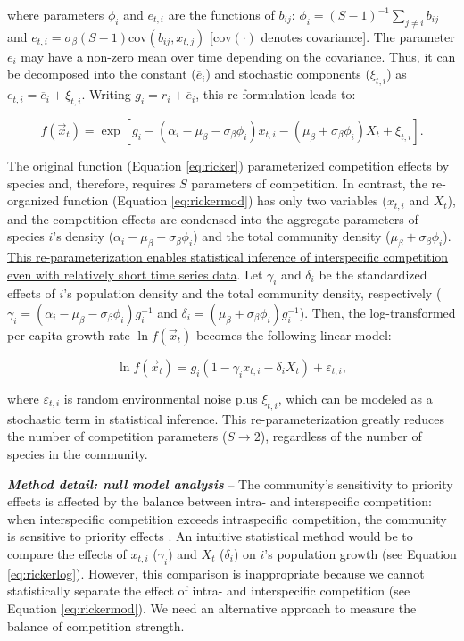 \documentclass[12pt, class=article, crop=false]{standalone}
\begin{document}
where parameters $\phi_{i}$ and $e_{t,i}$ are the functions of $b_{ij}$: $\phi_i = (S-1)^{-1}\sum_{j \ne i} b_{ij}$ and $e_{t,i} = \sigma_{\beta} (S - 1) \mbox{cov}(b_{ij}, x_{t,j})$ [$\mbox{cov}(\cdot)$ denotes covariance].
The parameter $e_i$ may have a non-zero mean over time depending on the covariance.
Thus, it can be decomposed into the constant ($\overline{e}_i$) and stochastic components ($\xi_{t,i}$) as $e_{t,i} = \overline{e}_i + \xi_{t,i}$.
Writing $g_{i} = r_i + \overline{e}_i$, this re-formulation leads to:

\begin{equation}
\label{eq:rickermod}
    f(\overset{\rightarrow}{x}_{t}) = \exp\left[g_{i} - (\alpha_i - \mu_{\beta} - \sigma_{\beta} \phi_i) x_{t,i} - (\mu_{\beta} +  \sigma_{\beta} \phi_i) X_t + \xi_{t,i} \right].
\end{equation}

The original function (Equation \ref{eq:ricker}) parameterized competition effects by species and, therefore, requires $S$ parameters of competition.
In contrast, the re-organized function (Equation \ref{eq:rickermod}) has only two variables ($x_{t,i}$ and $X_t$), and the competition effects are condensed into the aggregate parameters of species $i$'s density ($\alpha_i - \mu_{\beta} - \sigma_{\beta} \phi_i$) and the total community density ($\mu_{\beta} + \sigma_{\beta} \phi_i$).
\ul{This re-parameterization enables statistical inference of interspecific competition even with relatively short time series data}.
Let $\gamma_i$ and $\delta_i$ be the standardized effects of $i$'s population density and the total community density, respectively ($\gamma_i = (\alpha_i - \mu_{\beta} - \sigma_{\beta} \phi_i)g_i^{-1}$ and $\delta_i = (\mu_{\beta} + \sigma_{\beta} \phi_i)g_i^{-1}$).
Then, the log-transformed per-capita growth rate $\ln f(\overset{\rightarrow}{x}_{t})$ becomes the following linear model:

\begin{equation}
\label{eq:rickerlog}
    \ln f(\overset{\rightarrow}{x}_{t}) = g_i (1 - \gamma_i x_{t,i} - \delta_i X_t) + \varepsilon_{t,i},
\end{equation}

where $\varepsilon_{t,i}$ is random environmental noise plus $\xi_{t,i}$, which can be modeled as a stochastic term in statistical inference. This re-parameterization greatly reduces the number of competition parameters ($S \rightarrow 2$), regardless of the number of species in the community.

\textbf{\textit{Method detail: null model analysis}} --
The community's sensitivity to priority effects is affected by the balance between intra- and interspecific competition: when interspecific competition exceeds intraspecific competition, the community is sensitive to priority effects \citep{ke_coexistence_2018}.
An intuitive statistical method would be to compare the effects of $x_{t,i}$ ($\gamma_i$) and $X_t$ ($\delta_i$) on $i$'s population growth (see Equation \ref{eq:rickerlog}).
However, this comparison is inappropriate because we cannot statistically separate the effect of intra- and interspecific competition (see Equation \ref{eq:rickermod}).
We need an alternative approach to measure the balance of competition strength.
\end{document}
